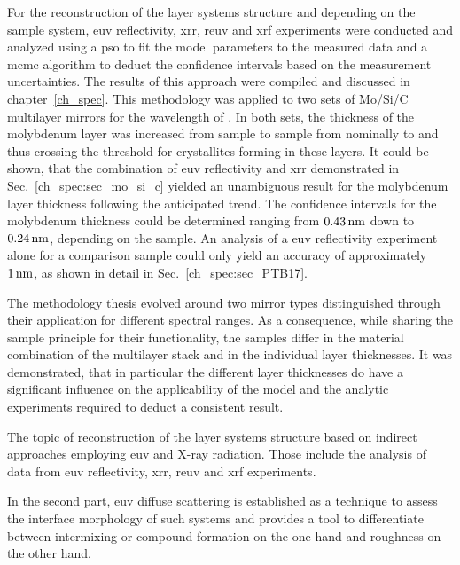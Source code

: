 For the reconstruction of the layer systems structure and depending on the sample system, \gls{euv} reflectivity, \gls{xrr}, \gls{reuv} and \gls{xrf} experiments were conducted and analyzed using a \glsdesc{pso} to fit the model parameters to the measured data and a \glsdesc{mcmc} algorithm to deduct the confidence intervals based on the measurement uncertainties. The results of this approach were compiled and discussed in chapter~\ref{ch_spec}. This methodology was applied to two sets of Mo/Si/C multilayer mirrors for the wavelength of . In both sets, the thickness of the molybdenum layer was increased from sample to sample from nominally  to  and thus crossing the threshold for crystallites forming in these layers. It could be shown, that the combination of \gls{euv} reflectivity and \glsdesc{xrr} demonstrated in Sec.~\ref{ch_spec:sec_mo_si_c} yielded an unambiguous result for the molybdenum layer thickness following the anticipated trend. The confidence intervals for the molybdenum thickness could be determined ranging from $\nm{0.43}$ down to $\nm{0.24}$, depending on the sample. An analysis of a \gls{euv} reflectivity experiment alone for a comparison sample could only yield an accuracy of approximately $\nm{1}$, as shown in detail in Sec.~\ref{ch_spec:sec_PTB17}.

The methodology thesis evolved around two mirror types distinguished through their application for different spectral ranges. As a consequence, while sharing the sample principle for their functionality, the samples differ in the material combination of the multilayer stack and in the individual layer thicknesses. It was demonstrated, that in particular the different layer thicknesses do have a significant influence on the applicability of the model and the analytic experiments required to deduct a consistent result.

The topic of reconstruction of the layer systems structure based on indirect approaches employing \gls{euv} and X-ray radiation. Those include the analysis of data from \gls{euv} reflectivity, \gls{xrr}, \gls{reuv} and \gls{xrf} experiments. 

In the second part, \gls{euv} diffuse scattering is established as a technique to assess the interface morphology of such systems and provides a tool to differentiate between intermixing or compound formation on the one hand and roughness on the other hand.

